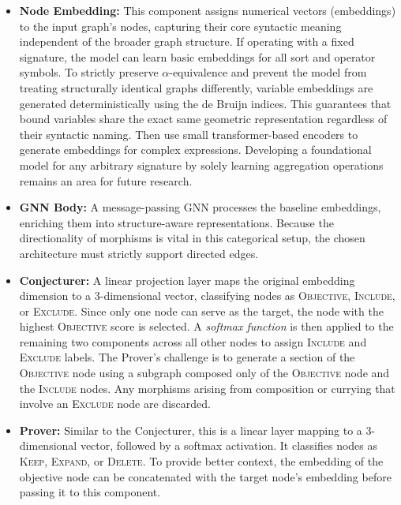 \begin{itemize}

    \item \textbf{Node Embedding:} This component assigns numerical vectors (embeddings) to the input graph's nodes,
        capturing their core syntactic meaning independent of the broader graph structure. If operating with 
        a fixed signature, the model can learn basic embeddings for all sort and operator symbols. 
        To strictly preserve $\alpha$-equivalence and prevent the model from treating structurally identical 
        graphs differently, variable embeddings are generated deterministically using the de Bruijn indices. 
        This guarantees that bound variables share the exact same geometric representation regardless of their syntactic naming. 
        Then use small transformer-based encoders to generate embeddings for complex expressions. Developing a 
        foundational model for any arbitrary signature by solely learning aggregation operations remains an 
        area for future research.
    
    \item \textbf{GNN Body:} A message-passing GNN processes the baseline embeddings, 
        enriching them into structure-aware representations. Because the directionality of 
        morphisms is vital in this categorical setup, the chosen architecture must strictly 
        support directed edges. 

    \item \textbf{Conjecturer:} A linear projection layer maps the original embedding dimension to a 3-dimensional 
        vector, classifying nodes as \textsc{Objective}, \textsc{Include}, or \textsc{Exclude}. Since only 
        one node can serve as the target, the node with the highest \textsc{Objective} score is selected. 
        A \textit{softmax function} \cite{gao2018} is then applied to the remaining two components across all other nodes to assign 
        \textsc{Include} and \textsc{Exclude} labels. The Prover's challenge is to generate a section of 
        the \textsc{Objective} node using a subgraph composed only of the \textsc{Objective} node and the 
        \textsc{Include} nodes. Any morphisms arising from composition or currying that involve an 
        \textsc{Exclude} node are discarded.

    \item \textbf{Prover:} Similar to the Conjecturer, this is a linear layer mapping to a 3-dimensional vector, 
        followed by a softmax activation. It classifies nodes as \textsc{Keep}, \textsc{Expand}, or 
        \textsc{Delete}. To provide better context, the embedding of the objective node can be 
        concatenated with the target node's embedding before passing it to this component.
\end{itemize}

